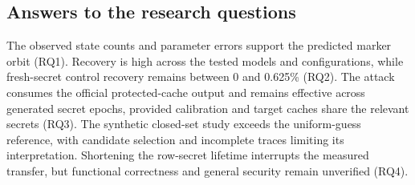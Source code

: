 \subsection{Answers to the research questions}
The observed state counts and parameter errors support the predicted marker orbit (RQ1). Recovery is high across the tested models and configurations, while fresh-secret control recovery remains between 0 and 0.625\% (RQ2). The attack consumes the official protected-cache output and remains effective across generated secret epochs, provided calibration and target caches share the relevant secrets (RQ3). The synthetic closed-set study exceeds the uniform-guess reference, with candidate selection and incomplete traces limiting its interpretation. Shortening the row-secret lifetime interrupts the measured transfer, but functional correctness and general security remain unverified (RQ4).
